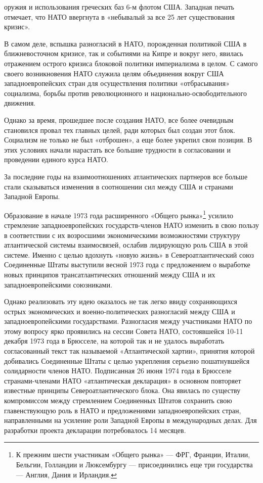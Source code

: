 \documentclass[12pt, a4paper, openany]{book}
\begin{document}
оружия и использования греческих баз 6-м флотом США. Западная печать отмечает, что НАТО ввергнута в «небывалый за все 25 лет существования кризис».
	
	В самом деле, вспышка разногласий в НАТО, порожденная политикой США в ближневосточном кризисе, так и событиями на Кипре и вокруг него, явилась отражением острого кризиса блоковой политики империализма в целом. С самого своего возникновения НАТО служила целям объединения вокруг США западноевропейских стран для осуществления политики «отбрасывания» социализма, борьбы против революционного и национально-освободительного движения.
	
	Однако за время, прошедшее после создания НАТО, все более очевидным становился провал тех главных целей, ради которых был создан этот блок. Социализм не только не был «отброшен», а еще более укрепил свои позиция. В этих условиях начали нарастать все большие трудности в согласовании и проведении единого курса НАТО.
	
	За последние годы на взаимоотношениях атлантических партнеров все больше стали сказываться изменения в соотношении сил между США и странами Западной Европы.
	
	Образование в начале 1973 года расширенного «Общего рынка»{\footnote{К прежним шести участникам «Общего рынка» — ФРГ, Франции, Италии, Бельгии, Голландии и Люксембургу — присоединились еще три государства — Англия, Дания и Ирландия.}} усилило стремление западноевропейских государств-членов НАТО изменить в свою пользу в соответствии с их возросшими экономическими возможностями структуру атлантической системы взаимосвязей, ослабив лидирующую роль США в этой системе. Именно с целью вдохнуть «новую жизнь» в Североатлантический союз Соединенные Штаты выступили весной 1973 года с предложением о выработке новых принципов трансатлантических отношений между США и их западноевропейскими союзниками.
	
	
	Однако реализовать эту идею оказалось не так легко ввиду сохраняющихся острых экономических и военно-политических разногласий между США и западноевропейскими государствами. Разногласия между участниками НАТО по этому вопросу ярко проявились на сессии Совета НАТО, состоявшейся 10-11 декабря 1973 года в Брюсселе, на которой так и не удалось выработать согласованный текст так называемой «Атлантической хартии», принятия которой добивались Соединенные Штаты с целью укрепления серьезно пошатнувшейся солидарности членов НАТО. Подписанная 26 июня 1974 года в Брюсселе странами-членами НАТО «атлантическая декларация» в основном повторяет известные принципы Североатлантического блока. Она явилась по существу компромиссом между стремлением Соединенных Штатов сохранить свою главенствующую роль в НАТО и предложениями западноевропейских стран, направленными на усиление роли Западной Европы в международных делах. Для разработки проекта декларации потребовалось 14 месяцев.
	
\end{document}
